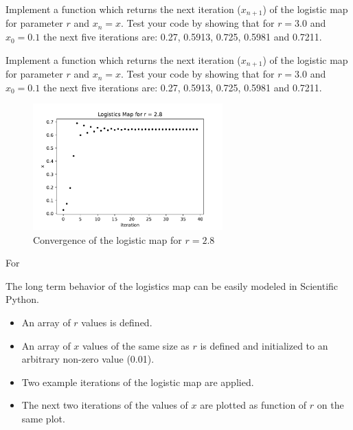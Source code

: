 \plot Implement a function  which returns the
next iteration ($x_{n+1}$) of the logistic map for parameter $r$ and
$x_n = x$.  Test your code by showing that for $r=3.0$ and $x_0=0.1$
the next five iterations are: 0.27, 0.5913, 0.725, 0.5981 and 0.7211.

\plot 



Implement a function  which returns the
next iteration ($x_{n+1}$) of the logistic map for parameter $r$ and
$x_n = x$.  Test your code by showing that for $r=3.0$ and $x_0=0.1$
the next five iterations are: 0.27, 0.5913, 0.725, 0.5981 and 0.7211.








\begin{figure}[htbp]
\begin{center}
\includegraphics[width=0.65\textwidth]{figs/plotting/converge.pdf} 
\caption{Convergence of the logistic map for $r=2.8$}
\label{fig:logmap}
\end{center}
\end{figure}








\plot For 










The long term behavior of the logistics map can be easily modeled in
Scientific Python.  
\begin{itemize}
\item An array of $r$ values is defined.
\item An array of $x$ values of the same size as $r$ is defined and initialized to an arbitrary non-zero value (0.01).
\item Two example iterations of the logistic map are applied.
\item The next two iterations of the values of $x$ are plotted as function of $r$ on the same plot.
\end{itemize}


